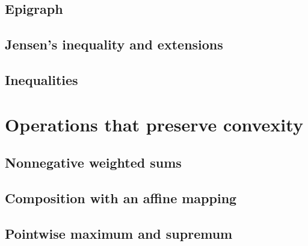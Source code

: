 \subsection{Epigraph}
\begin{example}
\end{example}

\subsection{Jensen's inequality and extensions}
\begin{remark}
\end{remark}

\subsection{Inequalities}

\section{Operations that preserve convexity}

\subsection{Nonnegative weighted sums}

\subsection{Composition with an affine mapping}

\subsection{Pointwise maximum and supremum}
\begin{example}
\end{example}
\begin{example}
\end{example}
\begin{example}
\end{example}
\begin{example}
\end{example}
\begin{example}
\end{example}
\begin{example}
\end{example}
\begin{example}
\end{example}

